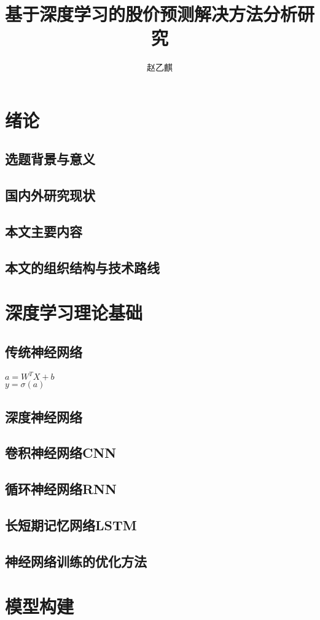 \documentclass[UTF8]{ctexart}
\author{赵乙麒}
\title{基于深度学习的股价预测解决方法分析研究}
\begin{document}
\maketitle

\section{绪论}
\subsection{选题背景与意义}
\subsection{国内外研究现状}
\subsection{本文主要内容}
\subsection{本文的组织结构与技术路线}
\section{深度学习理论基础}
\subsection{传统神经网络}
$ a=W^TX+b $\\
$ y=\sigma(a) $
\subsection{深度神经网络}
\subsection{卷积神经网络CNN}
\subsection{循环神经网络RNN}
\subsection{长短期记忆网络LSTM}
\subsection{神经网络训练的优化方法}
\section{模型构建}
\end{document}
